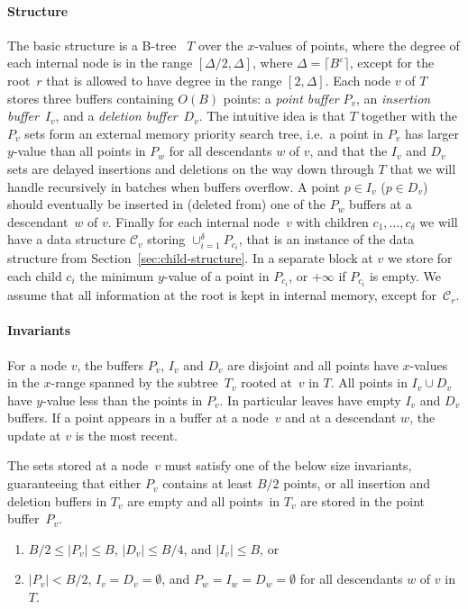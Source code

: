 \documentclass[11pt]{article}
\begin{document}
\paragraph*{Structure}

The basic structure is a B-tree~\cite{bm72} $T$ over the $x$-values of
points, where the degree of each internal node is in the range
$[\Delta/2,\Delta]$, where $\Delta=\lceil B^\varepsilon\rceil$, except
for the root~$r$ that is allowed to have degree in the range
$[2,\Delta]$.
%
Each node $v$ of $T$ stores three buffers containing $O(B)$ points: a
\emph{point buffer} $P_v$, an \emph{insertion buffer}~$I_v$, and a
\emph{deletion buffer}~$D_v$.  The intuitive idea is that $T$ together
with the $P_v$ sets form an external memory priority search tree,
i.e.\ a point in $P_v$ has larger $y$-value than all points in $P_w$
for all descendants $w$ of $v$, and that the $I_v$ and $D_v$ sets are
delayed insertions and deletions on the way down through $T$ that we
will handle recursively in batches when buffers overflow. A point
$p\in I_v$ ($p\in D_v$) should eventually be inserted in (deleted
from) one of the $P_w$ buffers at a descendant~$w$ of $v$.
%
Finally for each internal node~$v$ with children $c_1,\ldots,c_\delta$
we will have a data structure $\mathcal {C}_v$ storing
$\cup_{i=1}^{\delta} P_{c_i}$, that is an instance of the data
structure from Section~\ref{sec:child-structure}.
%
In a separate block at $v$ we store for each child $c_i$ the minimum
$y$-value of a point in $P_{c_i}$, or $+\infty$ if $P_{c_i}$ is empty.
We assume that all information at the root is kept in internal memory,
except for~$\mathcal{C}_r$.

\paragraph*{Invariants}

For a node $v$, the buffers $P_v$, $I_v$ and $D_v$ are disjoint and
all points have $x$-values in the $x$-range spanned by the
subtree~$T_v$ rooted at~$v$ in $T$. All points in $I_v\cup D_v$ have
$y$-value less than the points in $P_v$. In particular leaves have
empty $I_v$ and $D_v$ buffers. If a point appears in a buffer at a
node~$v$ and at a descendant $w$, the update at $v$ is the most
recent.

The sets stored at a node~$v$ must satisfy one of the below size
invariants, guaranteeing that either $P_v$ contains at least $B/2$
points, or all insertion and deletion buffers in $T_v$ are empty and
all points~in $T_v$ are stored in the point buffer~$P_v$.
\begin{enumerate}
  ,5ex
  \parskip0ex
\item
  $B/2 \leq |P_v| \leq B$, $|D_v| \leq B/4$, and $|I_v| \leq B$, or  
\item
  $|P_v|<B/2$, $I_v=D_v=\emptyset$, and $P_w=I_w=D_w=\emptyset$ for
  all descendants $w$ of $v$ in $T$.
\end{enumerate}
\end{document}
